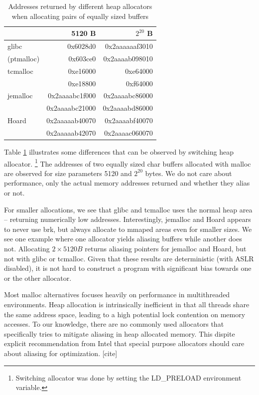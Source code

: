 \documentclass[a4paper,10pt,twocolumn,twoside]{article}
\begin{document}
\begin{table}[t]
  \caption{Addresses returned by different heap allocators when allocating pairs of equally sized buffers}
  \label{tab:mallocompare}
  \centering
  \small
  \begin{tabular}{l r r}
    \toprule
                      & 5120 B          & $2^{20}$ B \\
    \midrule
    glibc             & 0x6028d0        & 0x2aaaaaaf3010 \\
    (ptmalloc)        & 0x603ce0        & 0x2aaaab098010 \\
    \midrule
    tcmalloc          & 0xe16000        & 0xe64000 \\
                      & 0xe18800        & 0xf64000 \\
    \midrule
    jemalloc          & 0x2aaaabc1f000  & 0x2aaaabc86000 \\
                      & 0x2aaaabc21000  & 0x2aaaabd86000 \\
    \midrule
    Hoard             & 0x2aaaaab40070  & 0x2aaaabf40070 \\
                      & 0x2aaaaab42070  & 0x2aaaac060070 \\
    \bottomrule
  \end{tabular}
\end{table}

Table \ref{tab:mallocompare} illustrates some differences that can be observed by switching heap allocator. \footnote{Switching allocator was done by setting the LD\_PRELOAD environment variable.}
The addresses of two equally sized char buffers allocated with malloc are observed for size parameters 5120 and $2^{20}$ bytes. 
We do not care about performance, only the actual memory addresses returned and whether they alias or not.

For smaller allocations, we see that glibc and tcmalloc uses the normal heap area -- returning numerically low addresses.
Interestingly, jemalloc and Hoard appears to never use brk, but always allocate to mmaped areas even for smaller sizes.
We see one example where one allocator yields aliasing buffers while another does not. 
Allocating $2 \times 5120 B$ returns aliasing pointers for jemalloc and Hoard, but not with glibc or tcmalloc.
Given that these results are deterministic (with ASLR disabled), it is not hard to construct a program with significant bias towards one or the other allocator.

Most malloc alternatives focuses heavily on performance in multithreaded environments.
Heap allocation is intrinsically inefficient in that all threads share the same address space, leading to a high potential lock contention on memory accesses.
To our knowledge, there are no commonly used allocators that specifically tries to mitigate aliasing in heap allocated memory.
This dispite explicit recommendation from Intel that special purpose allocators should care about aliasing for optimization. [cite]
\end{document}
